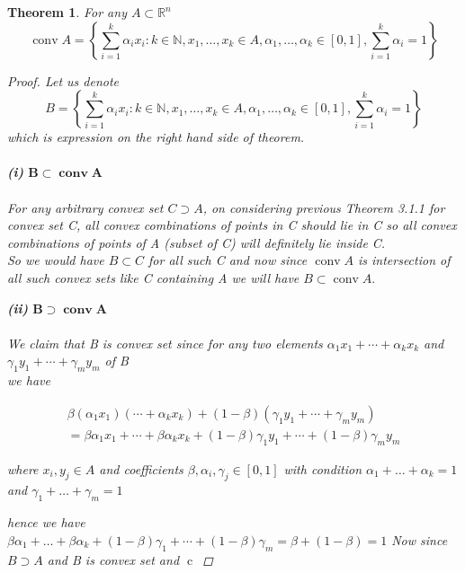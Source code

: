 \documentclass[oneside]{book}
\newtheorem{theorem}{Theorem}[section]
\begin{document}
 

\begin{theorem}
\label{t:5}
For  any $A \subset \mathbb{R}^n$
 $$ \operatorname{conv} A=\left\{\sum_{i=1}^{k} \alpha_{i} x_{i}: k \in \mathbb{N}, x_{1}, \ldots, x_{k} \in A, \alpha_{1}, \ldots, \alpha_{k} \in[0,1], \sum_{i=1}^{k} \alpha_{i}=1\right\} $$

 \begin{proof}
 Let us denote $$ B = \left\{\sum_{i=1}^{k} \alpha_{i} x_{i}: k \in \mathbb{N}, x_{1}, \ldots, x_{k} \in A, \alpha_{1}, \ldots, \alpha_{k} \in[0,1], \sum_{i=1}^{k} \alpha_{i}=1\right\} $$  which is expression on the right hand side of theorem.\\\\
 \textbf{(i)}  $ \mathbf{B} \subset \mathbf{\operatorname{conv} A}  $\\\\
     For any arbitrary convex set $C \supset A$, on considering previous Theorem 3.1.1 for convex set C, all convex combinations of points in C should lie in C so all convex combinations of points of A (subset of  C) will definitely lie inside C. \\ 
 So we would have $B\subset C $ for all such C and now since  $\operatorname{conv} A $ is intersection of all such convex sets like C containing A we will have  $ B \subset \operatorname{conv} A.  $  
 
 \textbf{(ii)}  $ \mathbf{B} \supset \mathbf{\operatorname{conv} A}  $\\\\
 We claim that B is convex set since for any two elements $\alpha_{1} x_{1}+\cdots+\alpha_{k} x_{k}$ and \\ $\gamma_{1} y_{1}+\cdots+\gamma_{m} y_{m}$  of B \\
 we have 
 
 
\begin{multline}
         \beta\left(\alpha_{1} x_{1}\right)  \left(\cdots+\alpha_{k} x_{k} \right) +(1-\beta)\left(\gamma_{1} y_{1}+\cdots+\gamma_{m} y_{m}\right) \\ = \beta \alpha_{1} x_{1}+\cdots+\beta \alpha_{k} x_{k}+(1-\beta) \gamma_{1} y_{1}+\cdots+(1-\beta) \gamma_{m} y_{m}  
\end{multline}
 
 where  $x_{i}, y_{j} \in A$ and coefficients $\beta, \alpha_{i}, \gamma_{j} \in[0,1]$ with  condition $\alpha_{1}+\ldots+\alpha_{k}=1$ and $\gamma_{1}+\ldots+\gamma_{m}=1$ 

hence we have \\
$
\beta \alpha_{1}+\ldots+\beta \alpha_{k}+(1-\beta) \gamma_{1}+\cdots+(1-\beta) \gamma_{m}=\beta+(1-\beta)=1
$
Now since $ B \supset A $ and B is convex set and $\operatorname{c}$
 

\end{proof}
\end{theorem}
\end{document}
